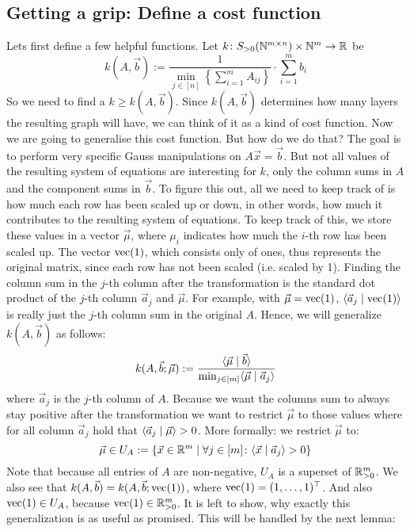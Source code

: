 \subsection{Getting a grip: Define a cost function}
Lets first define a few helpful functions. Let $k\colon S_{>0}(\mathbb{N}^{m \times n}) \times \mathbb{N}^m \to \mathbb{R}$ be
$$k(A, \vec b) := \frac{1}{\min_{j \in [n]} \left\{ \sum_{i=1}^{m}A_{ij}\right\}}\cdot \sum_{i=1}^{m}b_i$$
So we need to find a $k \geq k(A, \vec b)$. Since $k(A, \vec b)$ determines how many layers the resulting graph will have, we can think of it as a kind of cost function. Now we are going to generalise this cost function. But how do we do that? The goal is to perform very specific Gauss manipulations on $A\vec x = \vec b$. But not all values of the resulting system of equations are interesting for $k$, only the column sums in $A$ and the component sums in $\vec b$. To figure this out, all we need to keep track of is how much each row has been scaled up or down, in other words, how much it contributes to the resulting system of equations. To keep track of this, we store these values in a vector $\vec\mu$, where $\mu_i$ indicates how much the $i$-th row has been scaled up. The vector $\operatorname{vec}(1)$, which consists only of ones, thus represents the original matrix, since each row has not been scaled (i.e. scaled by 1). Finding the column sum in the $j$-th column after the transformation is the standard dot product of the $j$-th column $\vec a_j$ and $\vec\mu$. For example, with $\vec \mu = \operatorname{vec}(1)$, $\langle \vec a_j \mid \operatorname{vec}(1) \rangle$ is really just the $j$-th column sum in the original $A$. Hence, we will generalize $k(A, \vec b)$ as follows:
$$k(A, \vec b; \vec \mu) := \frac{\langle \vec{\mu} \mid \vec b \rangle}{\min_{j \in [m]} \langle \vec \mu \mid \vec a_j \rangle}$$
where $\vec a_j$ is the $j$-th column of $A$. Because we want the columns sum to always stay positive after the transformation we want to restrict $\vec\mu$ to those values where for all column $\vec a_j$ hold that $\langle \vec a_j \mid \vec\mu \rangle > 0$. More formally: we restrict $\vec\mu$ to:
$$\vec \mu \in U_A := \{\vec x \in \mathbb{R}^m \mid \forall j \in [m]\colon \langle \vec x \mid \vec a_j \rangle > 0\}$$
Note that because all entries of $A$ are non-negative, $U_A$ is a superset of $\mathbb{R}_{>0}^m$. We also see that $k(A, \vec b) = k(A, \vec b; \operatorname{vec}(1))$, where $\operatorname{vec}(1) = (1, \dots, 1)^\top$. And also $\operatorname{vec}(1) \in U_A$, because $\operatorname{vec}(1) \in \mathbb{R}^m_{>0}$. It is left to show, why exactly this generalization is as useful as promised. This will be handled by the next lemma:
